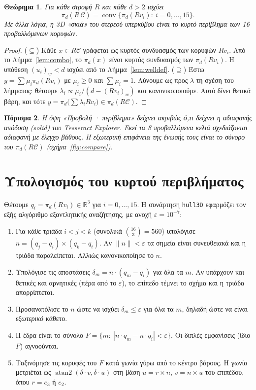 \documentclass[10pt,a4paper]{article}
\theoremstyle{plain}
\newtheorem{theorem}{Θεώρημα}
\newtheorem{corollary}[theorem]{Πόρισμα}
\theoremstyle{definition}
\newcommand{\R}{\mathbb{R}}
\newcommand{\C}{\mathcal{C}}
\newcommand{\code}[1]{\texttt{#1}}
\newcommand{\eng}[1]{\textenglish{#1}}
\DeclareMathOperator{\conv}{conv}
\begin{document}
\begin{theorem}\label{thm:convex}
Για κάθε στροφή $R$ και κάθε $d>2$ ισχύει
\[
\pi_d(R\,\C)=\conv\{\pi_d(Rv_i):\ i=0,\dots,15\}.
\]
Με άλλα λόγια, η 3D «σκιά» του στερεού υπερκύβου είναι το κυρτό περίβλημα των 16 προβαλλόμενων κορυφών.
\end{theorem}
\begin{proof}
($\subseteq$) Κάθε $x\in R\C$ γράφεται ως κυρτός συνδυασμός των κορυφών $Rv_i$. Από το Λήμμα~\ref{lem:combo}, το $\pi_d(x)$ είναι κυρτός συνδυασμός των $\pi_d(Rv_i)$. Η υπόθεση $(u_i)_w<d$ ισχύει από το Λήμμα~\ref{lem:welldef}.
($\supseteq$) Έστω $y=\sum\mu_i\pi_d(Rv_i)$ με $\mu_i\ge0$ και $\sum\mu_i=1$. Λύνουμε ως προς $\lambda$ τη σχέση του λήμματος: θέτουμε $\lambda_i\propto\mu_i/(d-(Rv_i)_w)$ και κανονικοποιούμε. Αυτό δίνει θετικά βάρη, και τότε $y=\pi_d\bigl(\sum\lambda_iRv_i\bigr)\in\pi_d(R\C)$.
\end{proof}

\begin{corollary}
Η όψη «Προβολή · περίβλημα» δείχνει ακριβώς ό,τι δείχνει η αδιαφανής απόδοση (\eng{solid}) του \eng{Tesseract Explorer}. Εκεί τα 8 προβαλλόμενα κελιά σχεδιάζονται αδιαφανή με έλεγχο βάθους. Η εξωτερική επιφάνεια της ένωσής τους είναι το σύνορο του $\pi_d(R\C)$ (σχήμα~\ref{fig:compare}).
\end{corollary}

\section{Υπολογισμός του κυρτού περιβλήματος}\label{sec:hull}
Θέτουμε $q_i=\pi_d(Rv_i)\in\R^3$ για $i=0,\dots,15$. Η συνάρτηση \code{hull3D} εφαρμόζει τον εξής αλγόριθμο εξαντλητικής αναζήτησης, με ανοχή $\varepsilon=10^{-7}$:

\begin{enumerate}[label=\arabic*.]
\item Για κάθε τριάδα $i<j<k$ (συνολικά $\binom{16}{3}=560$) υπολόγισε $n=(q_j-q_i)\times(q_k-q_i)$. Αν $\|n\|<\varepsilon$ τα σημεία είναι συνευθειακά και η τριάδα παραλείπεται. Αλλιώς κανονικοποίησε το $n$.
\item Υπολόγισε τις αποστάσεις $\delta_m=n\cdot(q_m-q_i)$ για όλα τα $m$. Αν υπάρχουν και θετικές και αρνητικές (πέρα από το $\varepsilon$), το επίπεδο τέμνει το σχήμα και η τριάδα απορρίπτεται.
\item Προσανατόλισε το $n$ ώστε να ισχύει $\delta_m\le\varepsilon$ για όλα τα $m$, δηλαδή ώστε να είναι \emph{εξωτερικό} κάθετο.
\item Η έδρα είναι το σύνολο $F=\{m:\ |n\cdot q_m-n\cdot q_i|<\varepsilon\}$. Οι διπλές εμφανίσεις (ίδιο $F$) αγνοούνται.
\item Ταξινόμησε τις κορυφές του $F$ κατά γωνία γύρω από το κέντρο βάρους. Η γωνία μετριέται ως $\operatorname{atan2}(\delta\cdot v,\delta\cdot u)$ στη βάση $u=r\times n$, $v=n\times u$ του επιπέδου, όπου $r=e_3$ ή $e_2$.
\end{enumerate}
\end{document}
